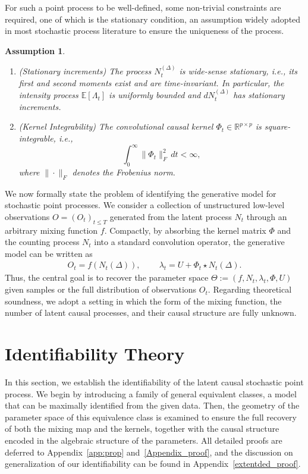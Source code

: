 \documentclass[10pt]{article}
\numberwithin{figure}{section}
\newtheorem{assumption}{Assumption}
\begin{document}
For such a point process to be well-defined, some non-trivial constraints are required, one of which is the stationary condition, an assumption widely adopted in most stochastic process literature to ensure the uniqueness of the process.
\begin{assumption}\label{Linear_idf_Assmption_2}
\begin{enumerate}
    \item (Stationary increments) The process \( N_t^{(\Delta)} \) is wide-sense stationary, i.e., its first and second moments exist and are time-invariant. In particular, the intensity process \( \mathbb{E}[\Lambda_t] \) is uniformly bounded and \( dN_t^{(\Delta)} \) has stationary increments.
    
    \item (Kernel Integrability) The convolutional causal kernel \( \Phi_t \in \mathbb{R}^{p \times p} \) is square-integrable, i.e.,
    \[
    \int_0^\infty \|\Phi_t\|_F^2 \, dt < \infty,
    \]
    where \( \|\cdot\|_F \) denotes the Frobenius norm.
\end{enumerate}
\end{assumption}

We now formally state the problem of identifying the generative model for stochastic point processes. We consider a collection of unstructured low-level observations $O=(O_t)_{t\le T}$ generated from the latent process $N_t$ through an arbitrary mixing function $f$. Compactly, by absorbing the kernel matrix $\Phi$ and the counting process $N_t$ into a standard convolution operator, the generative model can be written as
\begin{align}
    O_t = f(N_t(\Delta)), \qquad \ \lambda_t = U+ \Phi_{t}\star N_{t}(\Delta).\label{main:eq.2}
\end{align}
Thus, the central goal is to recover the parameter space $\Theta:= (f,N_t,\lambda_t,\Phi,U)$ given samples or the full distribution of observations $O_t$. Regarding theoretical soundness, we adopt a setting in which the form of the mixing function, the number of latent causal processes, and their causal structure are fully unknown.



\section{Identifiability Theory}\label{sec:identifiability}

In this section, we establish the identifiability of the latent causal stochastic point process. We begin by introducing a family of general equivalent classes, a model that can be maximally identified from the given data. Then, the geometry of the parameter space of this equivalence class is examined to ensure the full recovery of both the mixing map and the kernels, together with the causal structure encoded in the algebraic structure of the parameters. All detailed proofs are deferred to Appendix~\ref{app:prop} and~\ref{Appendix_proof}, and the discussion on generalization of our identifiability can be found in Appendix~\ref{extentded_proof}.
\end{document}
